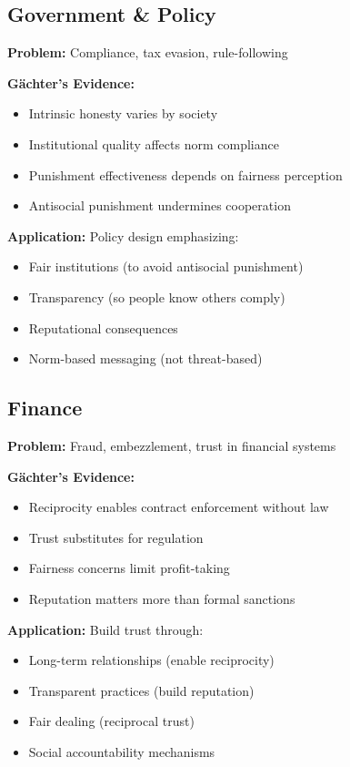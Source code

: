 \documentclass[11pt]{article}
\begin{document}
\subsection*{Government \& Policy}

\textbf{Problem:} Compliance, tax evasion, rule-following

\textbf{Gächter's Evidence:}
\begin{itemize}
    \item Intrinsic honesty varies by society
    \item Institutional quality affects norm compliance
    \item Punishment effectiveness depends on fairness perception
    \item Antisocial punishment undermines cooperation
\end{itemize}

\textbf{Application:} Policy design emphasizing:
\begin{itemize}
    \item Fair institutions (to avoid antisocial punishment)
    \item Transparency (so people know others comply)
    \item Reputational consequences
    \item Norm-based messaging (not threat-based)
\end{itemize}

\subsection*{Finance}

\textbf{Problem:} Fraud, embezzlement, trust in financial systems

\textbf{Gächter's Evidence:}
\begin{itemize}
    \item Reciprocity enables contract enforcement without law
    \item Trust substitutes for regulation
    \item Fairness concerns limit profit-taking
    \item Reputation matters more than formal sanctions
\end{itemize}

\textbf{Application:} Build trust through:
\begin{itemize}
    \item Long-term relationships (enable reciprocity)
    \item Transparent practices (build reputation)
    \item Fair dealing (reciprocal trust)
    \item Social accountability mechanisms
\end{itemize}
\end{document}
